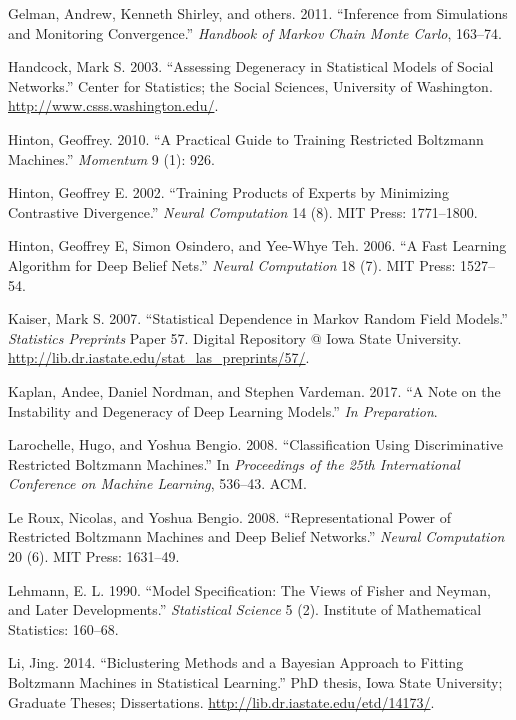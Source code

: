 \documentclass[12pt]{article}
\theoremstyle{definition}
\begin{document}
\hypertarget{ref-gelman2011inference}{}
Gelman, Andrew, Kenneth Shirley, and others. 2011. ``Inference from
Simulations and Monitoring Convergence.'' \emph{Handbook of Markov Chain
Monte Carlo}, 163--74.

\hypertarget{ref-handcock2003assessing}{}
Handcock, Mark S. 2003. ``Assessing Degeneracy in Statistical Models of
Social Networks.'' Center for Statistics; the Social Sciences,
University of Washington. \url{http://www.csss.washington.edu/}.

\hypertarget{ref-hinton2010practical}{}
Hinton, Geoffrey. 2010. ``A Practical Guide to Training Restricted
Boltzmann Machines.'' \emph{Momentum} 9 (1): 926.

\hypertarget{ref-hinton2002training}{}
Hinton, Geoffrey E. 2002. ``Training Products of Experts by Minimizing
Contrastive Divergence.'' \emph{Neural Computation} 14 (8). MIT Press:
1771--1800.

\hypertarget{ref-hinton2006fast}{}
Hinton, Geoffrey E, Simon Osindero, and Yee-Whye Teh. 2006. ``A Fast
Learning Algorithm for Deep Belief Nets.'' \emph{Neural Computation} 18
(7). MIT Press: 1527--54.

\hypertarget{ref-kaiser2007statistical}{}
Kaiser, Mark S. 2007. ``Statistical Dependence in Markov Random Field
Models.'' \emph{Statistics Preprints} Paper 57. Digital Repository @
Iowa State University.
\url{http://lib.dr.iastate.edu/stat_las_preprints/57/}.

\hypertarget{ref-kaplan2017note}{}
Kaplan, Andee, Daniel Nordman, and Stephen Vardeman. 2017. ``A Note on
the Instability and Degeneracy of Deep Learning Models.'' \emph{In
Preparation}.

\hypertarget{ref-larochelle2008classification}{}
Larochelle, Hugo, and Yoshua Bengio. 2008. ``Classification Using
Discriminative Restricted Boltzmann Machines.'' In \emph{Proceedings of
the 25th International Conference on Machine Learning}, 536--43. ACM.

\hypertarget{ref-le2008representational}{}
Le Roux, Nicolas, and Yoshua Bengio. 2008. ``Representational Power of
Restricted Boltzmann Machines and Deep Belief Networks.'' \emph{Neural
Computation} 20 (6). MIT Press: 1631--49.

\hypertarget{ref-lehmann1990model}{}
Lehmann, E. L. 1990. ``Model Specification: The Views of Fisher and
Neyman, and Later Developments.'' \emph{Statistical Science} 5 (2).
Institute of Mathematical Statistics: 160--68.

\hypertarget{ref-li2014biclustering}{}
Li, Jing. 2014. ``Biclustering Methods and a Bayesian Approach to
Fitting Boltzmann Machines in Statistical Learning.'' PhD thesis, Iowa
State University; Graduate Theses; Dissertations.
\url{http://lib.dr.iastate.edu/etd/14173/}.
\end{document}
